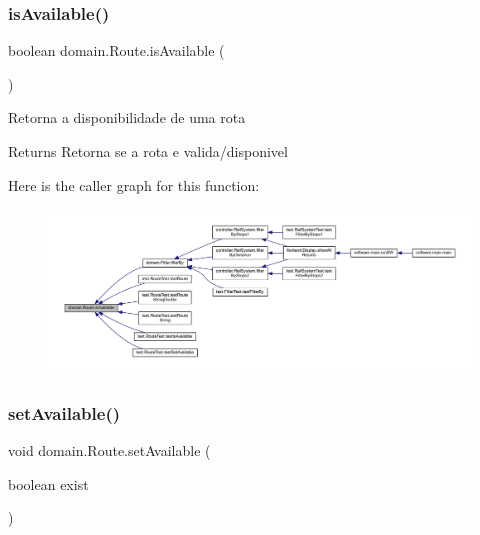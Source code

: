 \subsubsection{\texorpdfstring{is\+Available()}{isAvailable()}}
{\footnotesize\ttfamily boolean domain.\+Route.\+is\+Available (\begin{DoxyParamCaption}{ }\end{DoxyParamCaption})}

Retorna a disponibilidade de uma rota

\begin{DoxyReturn}{Returns}
Retorna se a rota e valida/disponivel 
\end{DoxyReturn}
Here is the caller graph for this function\+:\nopagebreak
\begin{figure}[H]
\begin{center}
\leavevmode
\includegraphics[width=350pt]{classdomain_1_1_route_addbf041cdbb4a24ff5f0b2a6fbce4c7d_icgraph}
\end{center}
\end{figure}
\mbox{\label{classdomain_1_1_route_a55e0dd8f63814b1708275082f4ba5fc4}} 
\subsubsection{\texorpdfstring{set\+Available()}{setAvailable()}}
{\footnotesize\ttfamily void domain.\+Route.\+set\+Available (\begin{DoxyParamCaption}\item[{boolean}]{exist }\end{DoxyParamCaption})}

